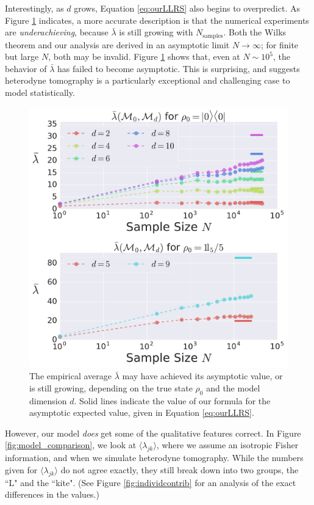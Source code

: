 \documentclass[aps,pra, twocolumn]{revtex4-1}
\begin{document}
Interestingly, as $d$ grows, Equation \eqref{eq:ourLLRS} also begins to overpredict. As Figure \ref{fig:totalcontrib} indicates, a more accurate description is that the numerical experiments are \emph{underachieving}, because $\bar\lambda$ is still growing with $N_{\mathrm{samples}}$.  Both the Wilks theorem and our analysis are derived in an asymptotic limit $N \rightarrow \infty$; for finite but large $N$, both may be invalid.  Figure \ref{fig:totalcontrib} shows that, even at $N\sim 10^{5}$, the behavior of $\bar{\lambda}$ has failed to become asymptotic. This is surprising, and suggests heterodyne tomography is a particularly exceptional and challenging case to model statistically. 

\begin{figure}[h]
  \includegraphics[width=\columnwidth]{Images/Figure_9.pdf}
 \caption{The empirical average $\bar{\lambda}$  may have achieved its asymptotic value, or is still 
growing, depending on the true state $\rho_{0}$ and the model dimension $d$. Solid lines indicate the value of our formula
for the asymptotic expected value, given in Equation \eqref{eq:ourLLRS}.}
\label{fig:totalcontrib}
\end{figure}


However, our model \emph{does} get some of the qualitative features correct. In Figure \ref{fig:model_comparison}, we look at $\langle \lambda_{jk}\rangle$, where we assume an isotropic Fisher information, and when we simulate heterodyne tomography. While the numbers given for $\langle \lambda_{jk} \rangle$ do not agree exactly, they still break down into two groups, the ``L" and the ``kite". (See Figure \ref{fig:individcontrib} for an analysis of the exact differences in the values.)
 
\end{document}
